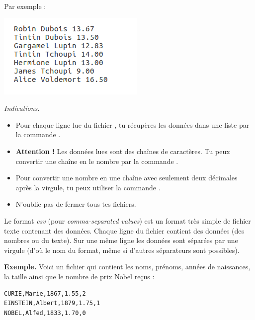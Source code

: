 \documentclass[11pt,class=report,crop=false]{standalone}
\begin{document}
\begin{activite}
\begin{enumerate}
    Par exemple :
\begin{center}
\includegraphics[scale=0.7]{ecran-fichiers-1b}
\end{center}  

  \emph{Indications.}
  \begin{itemize}
    	\item Pour chaque ligne lue du fichier , tu récupères les données dans  une liste par la commande .
    	
    	\item \textbf{Attention !} Les données lues sont des chaînes de caractères. Tu peux convertir une chaîne  en le nombre  par la commande .
    	
    	\item Pour convertir une nombre en une chaîne avec seulement deux décimales après la virgule, tu peux utiliser la commande .
    	
    	\item N'oublie pas de fermer tous tes fichiers.
    	
   \end{itemize}
    
\end{enumerate}   
     
\end{activite}



\begin{cours}
Le format \emph{csv} (pour  \emph{comma-separated values}) est un format très simple de fichier texte contenant des données.
Chaque ligne du fichier contient des données (des nombres ou du texte). Sur une même ligne les données sont séparées par une virgule (d'où le nom du format, même si d'autres séparateurs sont possibles).

\textbf{Exemple.} Voici un fichier qui contient les noms, prénoms, années de naissances, la taille ainsi que le nombre de prix Nobel reçus :
 \begin{center}
\begin{minipage}{0.4\textwidth}
\begin{lstlisting}
CURIE,Marie,1867,1.55,2
EINSTEIN,Albert,1879,1.75,1
NOBEL,Alfed,1833,1.70,0
\end{lstlisting}
\end{minipage}
\end{center}

\end{cours}
\end{document}
